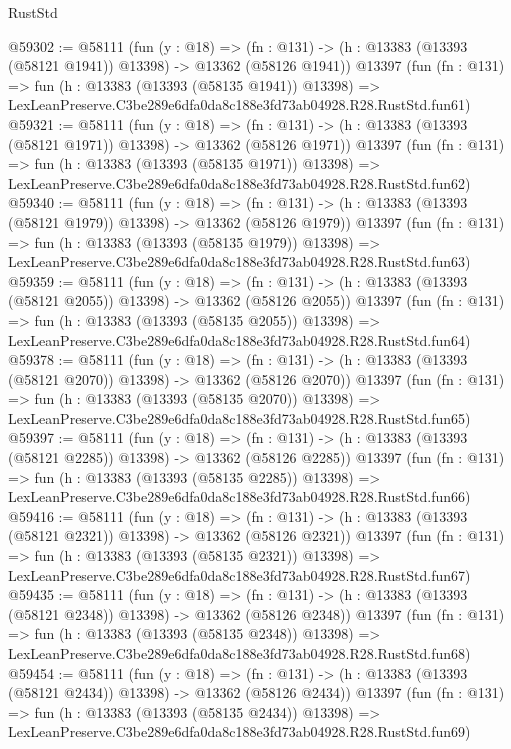 \begin{lexlean}{RustStd}
\begin{coremodule}
@59302 := @58111
    (fun (y : @18) =>
    (fn : @131) -> (h : @13383 (@13393 (@58121 @1941)) @13398) -> @13362 (@58126 @1941))
    @13397
    (fun (fn : @131) =>
    fun (h : @13383 (@13393 (@58135 @1941)) @13398) =>
    LexLeanPreserve.C3be289e6dfa0da8c188e3fd73ab04928.R28.RustStd.fun61)
@59321 := @58111
    (fun (y : @18) =>
    (fn : @131) -> (h : @13383 (@13393 (@58121 @1971)) @13398) -> @13362 (@58126 @1971))
    @13397
    (fun (fn : @131) =>
    fun (h : @13383 (@13393 (@58135 @1971)) @13398) =>
    LexLeanPreserve.C3be289e6dfa0da8c188e3fd73ab04928.R28.RustStd.fun62)
@59340 := @58111
    (fun (y : @18) =>
    (fn : @131) -> (h : @13383 (@13393 (@58121 @1979)) @13398) -> @13362 (@58126 @1979))
    @13397
    (fun (fn : @131) =>
    fun (h : @13383 (@13393 (@58135 @1979)) @13398) =>
    LexLeanPreserve.C3be289e6dfa0da8c188e3fd73ab04928.R28.RustStd.fun63)
@59359 := @58111
    (fun (y : @18) =>
    (fn : @131) -> (h : @13383 (@13393 (@58121 @2055)) @13398) -> @13362 (@58126 @2055))
    @13397
    (fun (fn : @131) =>
    fun (h : @13383 (@13393 (@58135 @2055)) @13398) =>
    LexLeanPreserve.C3be289e6dfa0da8c188e3fd73ab04928.R28.RustStd.fun64)
@59378 := @58111
    (fun (y : @18) =>
    (fn : @131) -> (h : @13383 (@13393 (@58121 @2070)) @13398) -> @13362 (@58126 @2070))
    @13397
    (fun (fn : @131) =>
    fun (h : @13383 (@13393 (@58135 @2070)) @13398) =>
    LexLeanPreserve.C3be289e6dfa0da8c188e3fd73ab04928.R28.RustStd.fun65)
@59397 := @58111
    (fun (y : @18) =>
    (fn : @131) -> (h : @13383 (@13393 (@58121 @2285)) @13398) -> @13362 (@58126 @2285))
    @13397
    (fun (fn : @131) =>
    fun (h : @13383 (@13393 (@58135 @2285)) @13398) =>
    LexLeanPreserve.C3be289e6dfa0da8c188e3fd73ab04928.R28.RustStd.fun66)
@59416 := @58111
    (fun (y : @18) =>
    (fn : @131) -> (h : @13383 (@13393 (@58121 @2321)) @13398) -> @13362 (@58126 @2321))
    @13397
    (fun (fn : @131) =>
    fun (h : @13383 (@13393 (@58135 @2321)) @13398) =>
    LexLeanPreserve.C3be289e6dfa0da8c188e3fd73ab04928.R28.RustStd.fun67)
@59435 := @58111
    (fun (y : @18) =>
    (fn : @131) -> (h : @13383 (@13393 (@58121 @2348)) @13398) -> @13362 (@58126 @2348))
    @13397
    (fun (fn : @131) =>
    fun (h : @13383 (@13393 (@58135 @2348)) @13398) =>
    LexLeanPreserve.C3be289e6dfa0da8c188e3fd73ab04928.R28.RustStd.fun68)
@59454 := @58111
    (fun (y : @18) =>
    (fn : @131) -> (h : @13383 (@13393 (@58121 @2434)) @13398) -> @13362 (@58126 @2434))
    @13397
    (fun (fn : @131) =>
    fun (h : @13383 (@13393 (@58135 @2434)) @13398) =>
    LexLeanPreserve.C3be289e6dfa0da8c188e3fd73ab04928.R28.RustStd.fun69)

\end{coremodule}
\end{lexlean}
